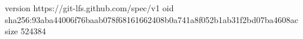 version https://git-lfs.github.com/spec/v1
oid sha256:93aba44006f76baab078f68161662408b0a741a8f052b1ab31f2bd07ba4608ac
size 524384
